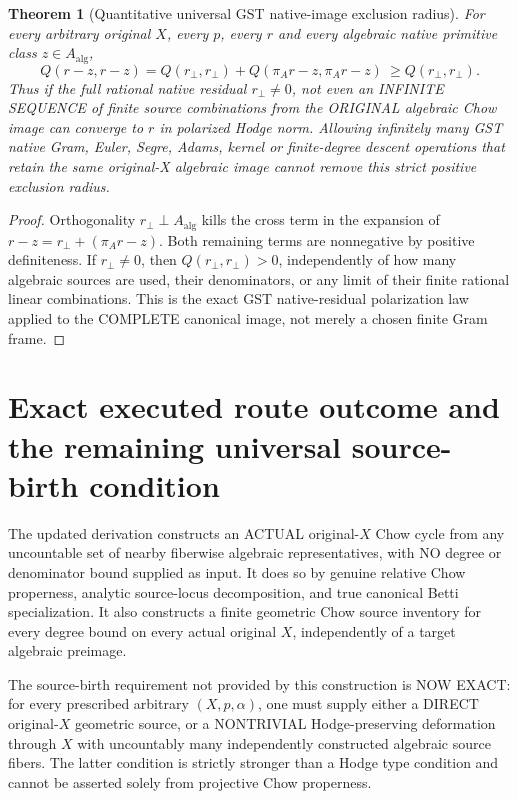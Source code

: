\documentclass[11pt]{article}
\newtheorem{theorem}{Theorem}
\begin{document}
\begin{theorem}[Quantitative universal GST native-image exclusion radius]
For every arbitrary original
\(X\), every \(p\), every \(r\)
and every algebraic native
primitive class
\(z\in A_{\mathrm{alg}}\),
\[
 \boxed{
 Q(r-z,r-z)
 =Q(r_\perp,r_\perp)
       +Q(\pi_A r-z,\pi_A r-z)
 \ \ge Q(r_\perp,r_\perp).}                       \tag{4}
\]
Thus if the full rational
native residual \(r_\perp\ne0\),
not even an INFINITE SEQUENCE
of finite source combinations
from the ORIGINAL algebraic
Chow image can converge to
\(r\) in polarized Hodge norm.
Allowing infinitely many
GST native Gram, Euler,
Segre, Adams, kernel or
finite-degree descent
operations that retain
the same original-X
algebraic image cannot
remove this strict
positive exclusion radius.
\end{theorem}
\begin{proof}
Orthogonality
\(r_\perp\perp A_{\mathrm{alg}}\)
kills the cross term in
the expansion of
\(r-z=r_\perp+(\pi_A r-z)\).
Both remaining terms are
nonnegative by positive
definiteness. If
\(r_\perp\ne0\), then
\(Q(r_\perp,r_\perp)>0\),
independently of how many
algebraic sources are used,
their denominators, or any
limit of their finite rational
linear combinations.
This is the exact GST
native-residual polarization
law applied to the COMPLETE
canonical image, not merely
a chosen finite Gram frame.
\end{proof}

\section{Exact executed route outcome and the remaining universal source-birth condition}
The updated derivation
constructs an ACTUAL
original-\(X\)
Chow cycle
from any
uncountable
set of nearby
fiberwise
algebraic
representatives,
with NO
degree or
denominator
bound supplied
as input.
It does so
by genuine
relative Chow
properness,
analytic
source-locus
decomposition,
and true
canonical Betti
specialization.
It also
constructs a
finite geometric
Chow source
inventory for
every degree
bound on every
actual original
\(X\),
independently
of a target
algebraic
preimage.

The source-birth
requirement not
provided by this
construction is
NOW EXACT:
for every
prescribed
arbitrary
\((X,p,\alpha)\),
one must
supply either
a DIRECT
original-\(X\)
geometric source,
or a
NONTRIVIAL
Hodge-preserving
deformation
through \(X\)
with uncountably
many
independently
constructed
algebraic
source fibers.
The latter
condition is
strictly stronger
than a
Hodge type
condition
and cannot
be asserted
solely from
projective
Chow properness.
\end{document}
